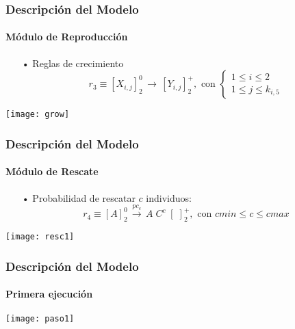 \documentclass[10pt,a4paper]{beamer}
\theoremstyle{definition}
\theoremstyle{remark}
\begin{document}
\begin{frame}
\frametitle{Descripción del Modelo}
\framesubtitle{Módulo de Reproducción}
\begin{small}
\begin{itemize}
\item[•] Reglas de crecimiento
$$r_3 \equiv [X_{i,j}]^0_2 \, \longrightarrow \,  [Y_{i,j}]^+_2 , \text{ con } \left \{ \begin{matrix} 1 \leq i \leq 2
\\ 1\leq j \leq k_{i,5} \end{matrix}\right. $$
\end{itemize}
\end{small}
\begin{center}
\texttt{[image: grow]}
\end{center}
\end{frame}


\begin{frame}
\frametitle{Descripción del Modelo}
\framesubtitle{Módulo de Rescate}
\begin{small}
\begin{itemize}
\item[•] Probabilidad de rescatar $c$ individuos:
$$r_4 \equiv [A]^0_2 \, \xrightarrow{pc_c} \,  A\; C^c \; [\;]^+_2 , \text{ con }  cmin \leq c \leq cmax $$
\end{itemize}
\end{small}
\begin{center}
\texttt{[image: resc1]}
\end{center}
\end{frame}

\begin{frame}
\frametitle{Descripción del Modelo}
\framesubtitle{Primera ejecución}
\begin{center}
\texttt{[image: paso1]}
\end{center}
\end{frame}
\end{document}
